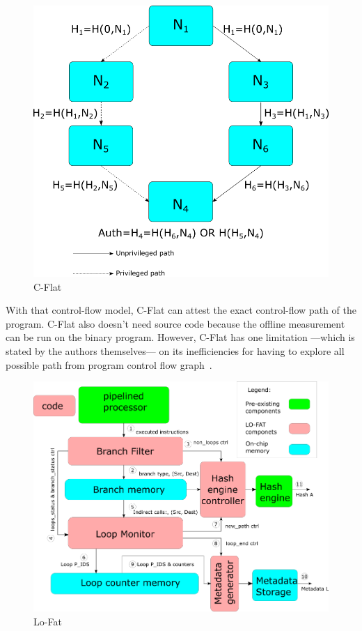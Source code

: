 \begin{figure}[htbp]
\centerline{\includegraphics[scale=.5]{Figures/01/cflat-overview.png}}
\caption{C-Flat}
\label{fig:c-flat}
\end{figure}

With that control-flow model, C-Flat can attest the exact control-flow path of
the program. C-Flat also doesn't need source code because the offline
measurement can be run on the binary program. However, C-Flat has one limitation
---which is stated by the authors themselves--- on its inefficiencies for having
to explore all possible path from program control flow
graph~\cite{aberaCFLATControlFlowAttestation2016}.

\begin{figure}[htbp]
\centerline{\includegraphics[scale=.5]{Figures/01/lofat-overview.png}}
\caption{Lo-Fat}
\label{fig:lo-fat}
\end{figure}

